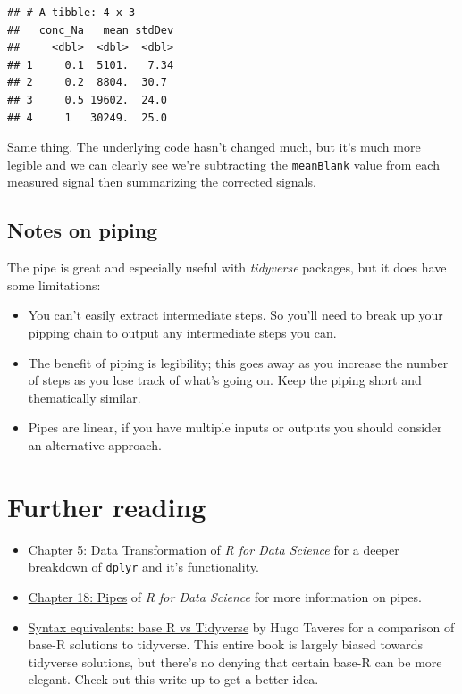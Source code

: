\documentclass[
]{book}
\providecommand{\tightlist}{%
  \setlength{\itemsep}{0pt}\setlength{\parskip}{0pt}}
\begin{document}
\begin{verbatim}
## # A tibble: 4 x 3
##   conc_Na   mean stdDev
##     <dbl>  <dbl>  <dbl>
## 1     0.1  5101.   7.34
## 2     0.2  8804.  30.7 
## 3     0.5 19602.  24.0 
## 4     1   30249.  25.0
\end{verbatim}

Same thing. The underlying code hasn't changed much, but it's much more legible and we can clearly see we're subtracting the \texttt{meanBlank} value from each measured signal then summarizing the corrected signals.

\hypertarget{notes-on-piping}{%
\subsection{Notes on piping}\label{notes-on-piping}}

The pipe is great and especially useful with \emph{tidyverse} packages, but it does have some limitations:

\begin{itemize}
\tightlist
\item
  You can't easily extract intermediate steps. So you'll need to break up your pipping chain to output any intermediate steps you can.
\item
  The benefit of piping is legibility; this goes away as you increase the number of steps as you lose track of what's going on. Keep the piping short and thematically similar.
\item
  Pipes are linear, if you have multiple inputs or outputs you should consider an alternative approach.
\end{itemize}

\hypertarget{further-reading-5}{%
\section{Further reading}\label{further-reading-5}}

\begin{itemize}
\tightlist
\item
  \href{https://r4ds.had.co.nz/transform.html}{Chapter 5: Data Transformation} of \emph{R for Data Science} for a deeper breakdown of \texttt{dplyr} and it's functionality.
\item
  \href{https://r4ds.had.co.nz/pipes.html}{Chapter 18: Pipes} of \emph{R for Data Science} for more information on pipes.
\item
  \href{https://tavareshugo.github.io/data_carpentry_extras/base-r_tidyverse_equivalents/base-r_tidyverse_equivalents.html}{Syntax equivalents: base R vs Tidyverse} by Hugo Taveres for a comparison of base-R solutions to tidyverse. This entire book is largely biased towards tidyverse solutions, but there's no denying that certain base-R can be more elegant. Check out this write up to get a better idea.
\end{itemize}
\end{document}
